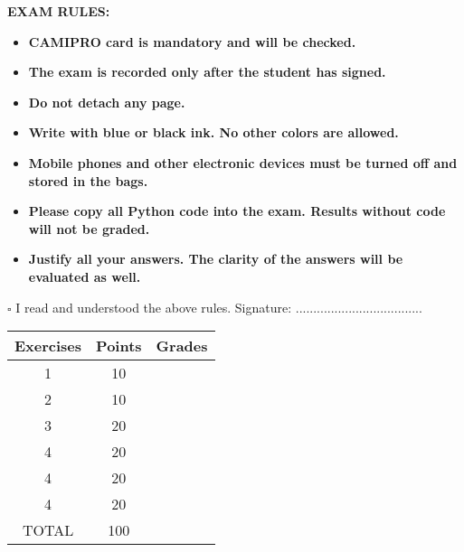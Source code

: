 \documentclass[a4paper]{article}%
\begin{document}
\vspace{.3cm}\noindent
\textbf{EXAM RULES:}
\noindent
\begin{itemize}

  \item \textbf{CAMIPRO card is mandatory and will be checked.}
  \item \textbf{The exam is recorded only after the student has signed.} 
  \item \textbf{Do not detach any page.}
  \item \textbf{Write with blue or black ink. No other colors are allowed.}
  \item \textbf{Mobile phones and other electronic devices must be turned off and stored in the bags.}
  \item \textbf{Please copy all Python code into the exam. Results without code will not be graded.}
  \item \textbf{Justify all your answers. The clarity of the answers will be evaluated as well.}
\end{itemize}

\vspace{1cm} 
\noindent $\square$ I read and understood the above rules.
\vspace{1cm}
Signature: ....................................

\vfill

\begin{center}                                                       
  \begin{tabular}{|c|c|c|}
    \hline
    Exercises & Points & Grades \\ \hline
    1 & 10 & \\ \hline
    2 & 10 & \\ \hline
    3 & 20 & \\ \hline
    4 & 20 & \\ \hline
    4 & 20 & \\ \hline
    4 & 20 & \\ \hline
    TOTAL & 100 &  \\ \hline
  \end{tabular}
\end{center}

\clearpage

\text{ }\clearpage %
                                 
\end{document}
